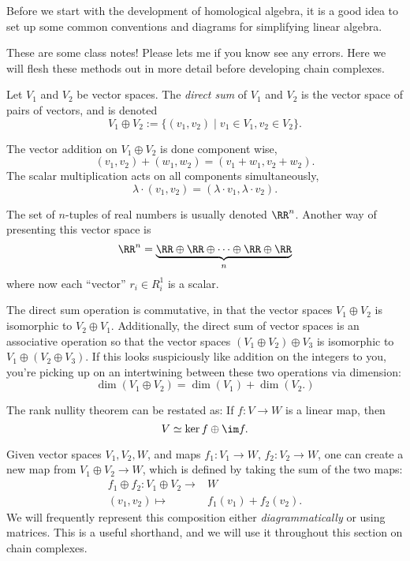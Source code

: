 
\cleartoverso 
{}
\label{chap:homologicalalgebra}

\begin{elevator}
	Before we start with the development of homological algebra, it is a good idea to set up some common conventions and diagrams for simplifying linear algebra. 
\end{elevator}

\label{sec:chaincomplexes:intro}
These are some class notes! Please lets me if you know see any errors. Here we will flesh these methods out in more detail before developing chain complexes. \\
\begin{definition}
Let $V_1$ and $V_2$ be vector spaces. The \emph{direct sum} of $V_1$ and $V_2$ is the vector space of pairs of vectors, and is denoted 
\[V_1\oplus V_2:=\{(v_1, v_2)\;|\; v_1\in V_1, v_2\in V_2\}.\]
\end{definition}
The vector addition on $V_1\oplus V_2$ is done component wise,
\[(v_1, v_2)+(w_1, w_2)=(v_1+w_1, v_2+w_2).\]
The scalar multiplication acts on all components simultaneously,
\[\lambda\cdot (v_1, v_2)= (\lambda\cdot v_1, \lambda\cdot v_2).\]
\begin{example}
	The set of $n$-tuples of real numbers is usually denoted $\RR^n$. Another way of presenting this vector space is 
	\[\RR^n=\underbrace{\RR\oplus \RR \oplus \cdots \oplus \RR\oplus \RR}_n\]
	where now each ``vector'' $r_i\in R^1_i$ is a scalar. 
	\end{example}
The direct sum operation is commutative, in that the vector spaces $V_1\oplus V_2$ is isomorphic to $V_2\oplus V_1$. Additionally, the direct sum of vector spaces is an associative operation so that the vector spaces $(V_1\oplus V_2)\oplus V_3$ is isomorphic to $V_1\oplus(V_2\oplus V_3)$. 
If this looks suspiciously like addition on the integers to you, you're picking up on an intertwining between these two operations via dimension:
\[\dim(V_1\oplus V_2)=\dim(V_1)+ \dim(V_2.)\]
\begin{example}The rank nullity theorem can be restated as: If $f: V\to W$ is a linear map, then 
\[V\simeq \ker f\oplus \im f. \]
\end{example}
Given vector spaces $V_1, V_2, W$, and maps $f_1: V_1\to W$, $f_2: V_2\to W$, one can create a new map from $V_1\oplus V_2\to W$, which is defined by taking the sum of the two maps:
\begin{align*}
f_1\oplus f_2: V_1\oplus V_2 \to&  W\\
(v_1, v_2)\mapsto& f_1(v_1)+f_2(v_2).
\end{align*}
We will frequently represent this composition either \emph{diagrammatically} or {using matrices.}
This is a useful shorthand, and we will use it throughout this section on chain complexes.

